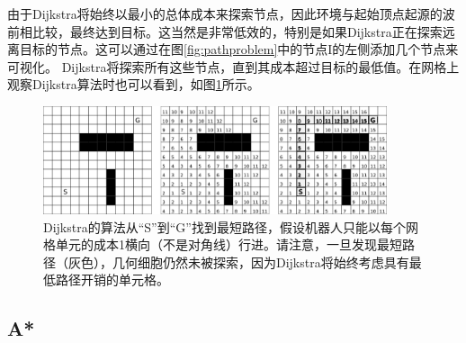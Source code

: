 由于Dijkstra将始终以最小的总体成本来探索节点，因此环境与起始顶点起源的波前相比较，最终达到目标。这当然是非常低效的，特别是如果Dijkstra正在探索远离目标的节点。这可以通过在图\ref{fig:pathproblem}中的节点I的左侧添加几个节点来可视化。 Dijkstra将探索所有这些节点，直到其成本超过目标的最低值。在网格上观察Dijkstra算法时也可以看到，如图\ref{fig:dijkstragrid}所示。

\begin{figure}[htb]
\centering
\includegraphics[width=0.9\textwidth]{figs/dijkstragrid}
\caption{Dijkstra的算法从“S”到“G”找到最短路径，假设机器人只能以每个网格单元的成本1横向（不是对角线）行进。请注意，一旦发现最短路径（灰色），几何细胞仍然未被探索，因为Dijkstra将始终考虑具有最低路径开销的单元格。 \label{fig:dijkstragrid}}
\end{figure}

\subsection{A*}\label{sec:astar}

